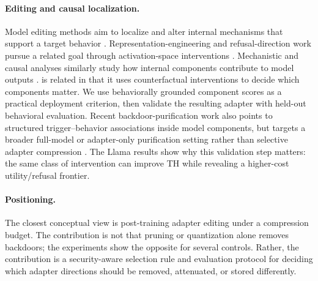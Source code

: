 \paragraph{Editing and causal localization.}
Model editing methods aim to localize and alter internal mechanisms that support a target behavior \citep{meng2022rome,meng2023memit}.
Representation-engineering and refusal-direction work pursue a related goal through activation-space interventions \citep{zou2023representation,arditi2024refusal}.
Mechanistic and causal analyses similarly study how internal components contribute to model outputs \citep{elhage2021transformer,huben2024sparseautoencoders}.
\sac{} is related in that it uses counterfactual interventions to decide which components matter.
We use behaviorally grounded component scores as a practical deployment criterion, then validate the resulting adapter with held-out behavioral evaluation.
Recent backdoor-purification work also points to structured trigger--behavior associations inside model components, but targets a broader full-model or adapter-only purification setting rather than selective adapter compression \citep{li2026purifying}.
The Llama results show why this validation step matters: the same class of intervention can improve TH while revealing a higher-cost utility/refusal frontier.

\paragraph{Positioning.}
The closest conceptual view is post-training adapter editing under a compression budget.
The contribution is not that pruning or quantization alone removes backdoors; the experiments show the opposite for several controls.
Rather, the contribution is a security-aware selection rule and evaluation protocol for deciding which adapter directions should be removed, attenuated, or stored differently.
